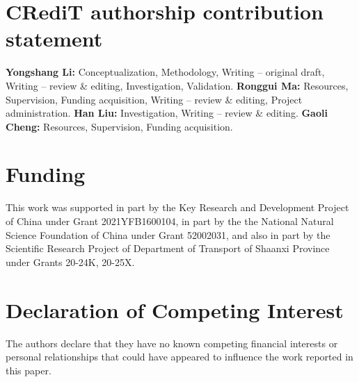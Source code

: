\documentclass[preprint,12pt,authoryear]{elsarticle}
\begin{document}
\section*{CRediT authorship contribution statement}
\textbf{Yongshang Li:} Conceptualization, Methodology, Writing – original draft, Writing – review \& editing, Investigation, Validation. \textbf{Ronggui Ma:} Resources, Supervision, Funding acquisition, Writing – review \& editing, Project administration. \textbf{Han Liu:} Investigation, Writing – review \& editing. \textbf{Gaoli Cheng:} Resources, Supervision, Funding acquisition.

\section*{Funding}
This work was supported in part by the Key Research and Development Project of China under Grant 2021YFB1600104, in part by the the National Natural Science Foundation of China under Grant 52002031, and also in part by the Scientific Research Project of Department of Transport of Shaanxi Province under Grants 20-24K, 20-25X.

\section*{Declaration of Competing Interest}
The authors declare that they have no known competing financial interests or personal relationships that could have appeared to influence the work reported in this paper.




  
 








\end{document}
